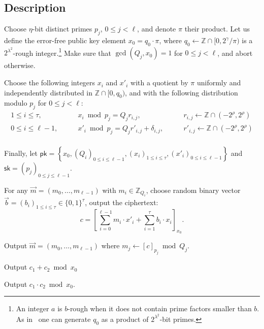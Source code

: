 \documentclass[11pt]{llncs}
\renewcommand\leq\leqslant
\newcommand{\Z}{{\mathbb Z}}
\DeclareMathOperator{\KeyGen}{\ensuremath{\mathsf{KeyGen}}}
\DeclareMathOperator{\Encrypt}{\ensuremath{\mathsf{Encrypt}}}
\DeclareMathOperator{\Decrypt}{\ensuremath{\mathsf{Decrypt}}}
\DeclareMathOperator{\Add}{\ensuremath{\mathsf{Add}}}
\DeclareMathOperator{\Mult}{\ensuremath{\mathsf{Mult}}}
\newcommand*{\pk}{\ensuremath{\mathsf{pk}}}
\newcommand*{\sk}{\ensuremath{\mathsf{sk}}}
\newcommand*{\CDGHV}{\ensuremath{\mathsf{IDGHV}}}
\begin{document}
\subsection{Description}
\begin{description}\label{CDGHV}
\item[$\CDGHV.\KeyGen(1^\lambda,(Q_j)_{0\leq j <\ell})$.] Choose $\eta$-bit distinct primes $p_j$, $0\leq j<\ell$, and denote $\pi$
their product. Let us define the error-free public key element
$x_0=q_0\cdot\pi$, where $q_0 \gets \Z \cap [0,2^{\gamma}/\pi)$
  is a $2^{\lambda^2}$-rough integer.\footnote{An integer $a$ is $b$-rough when it does
    not contain prime factors smaller than $b$. As in~\cite{CMNT2011} one can
    generate $q_0$ as a product of $2^{\lambda^2}$-bit primes.}  
  Make sure that $\gcd(Q_j,x_0)=1$ for $0\leq j<\ell$, and abort otherwise.
  
  Choose the following integers $x_i$ and $x'_i$ with a quotient by $\pi$ uniformly
  and independently distributed in $\Z\cap [0, q_0)$, and with the
    following distribution modulo $p_j$ for $0 \leq j < \ell$:
$$
\begin{array}{lll}
1 \leq i \leq \tau, & \qquad x_i\bmod p_j = Q_j r_{i,j},& \qquad r_{i,j}
\gets\Z\cap(-2^{\rho}, 2^{\rho}) \\[.2cm]

0\leq i\leq \ell-1, & \qquad x'_i\bmod p_j = Q_jr'_{i,j}+\delta_{i,j}, &
\qquad r'_{i,j}\gets\Z\cap(-2^{\rho}, 2^{\rho}) \\[.2cm]

\end{array}
$$

Finally, let $\pk = \left\{ x_0, \left(Q_i\right)_{0\leq i \leq \ell-1},\left(x_i\right)_{1\leq i\leq \tau}, \left(x'_i\right)_{0\leq i\leq \ell-1}\right\}$ and $\sk=(p_j)_{0\leq j\leq {\ell-1}}$.
\\\vspace{-0.25cm}
\item[$\CDGHV.\Encrypt(\pk, {\vec{m}})$.] For any $\vec{m}=(m_0,\dots,m_{\ell-1})$ with $m_i\in\Z_{Q_i}$, choose random binary vector $\vec{b}=(b_i)_{1\leq i \leq \tau}\in \{0,1\}^\tau$, output the ciphertext:
\begin{equation}
\label{eq:enccdghv}
c = \left[\sum\limits_{i=0}^{\ell-1} m_i \cdot x'_i + 
	\sum_{i=1}^\tau 
b_i\cdot x_i\right]_{x_0}.
\end{equation}
\item[$\CDGHV.\Decrypt(\sk, c)$.] Output $\vec{m}=(m_0,\ldots,m_{\ell-1})$ where $m_j \gets [c]_{p_j} \bmod Q_j$.
\\\vspace{-0.25cm}
\item[$\CDGHV.\Add(\pk, c_1, c_2)$.] Output $c_1+c_2 \bmod x_0$
\\\vspace{-0.25cm}
\item[$\CDGHV.\Mult(\pk, c_1, c_2)$.] Output $c_1 \cdot c_2 \bmod x_0$.
\end{description}
\end{document}
